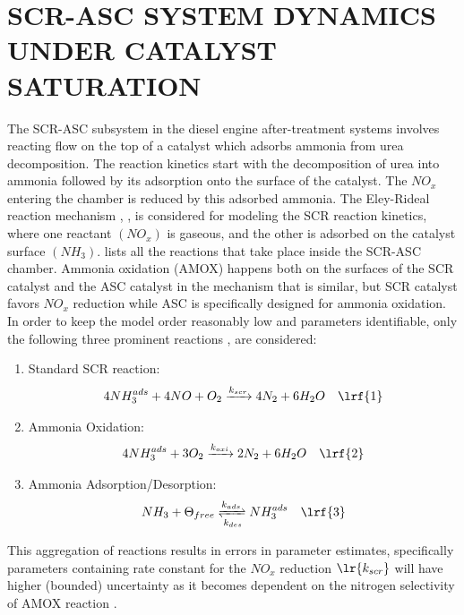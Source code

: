 \section{SCR-ASC SYSTEM DYNAMICS UNDER CATALYST SATURATION}
The SCR-ASC subsystem in the diesel engine after-treatment systems involves reacting flow on the top of a catalyst which
adsorbs ammonia from urea decomposition. The reaction kinetics start with the decomposition of urea into ammonia
followed by its adsorption onto the surface of the catalyst. The $NO_x$ entering the chamber is reduced by this adsorbed
ammonia. The Eley-Rideal reaction mechanism \cite{yuan2015diesel}, \cite{hsieh2011development}, \cite{nova2014urea} is
considered for modeling the SCR reaction kinetics, where one reactant $(NO_x)$ is gaseous, and the other is adsorbed on
the catalyst surface $(NH_3)$. \cite{nova2014urea} lists all the reactions that take place inside the
SCR-ASC chamber. Ammonia oxidation (AMOX) happens both on the surfaces of the SCR catalyst and the ASC catalyst in the
mechanism that is similar, but SCR catalyst favors $NO_x$ reduction while ASC is specifically designed for ammonia
oxidation.
In order to keep the model order reasonably low and parameters identifiable, only the following three prominent reactions \cite{devarakonda2008adequacy},\cite{hsieh2011development} are considered:
\begin{enumerate}
    \item Standard SCR reaction:
    \begin{align*}
        4 NH_3 ^{ads} + 4 NO + O_2 &\xrightarrow[]{k_{scr}} 4 N_2 + 6 H_2O %
        & \lrf{1}
    \end{align*}
    \item Ammonia Oxidation:
    \begin{align*}
        4 NH_3^{ads} + 3 O_2 &\xrightarrow[]{k_{oxi}} 2 N_2 + 6 H_2O %
        & \lrf{2}
    \end{align*}
    \item Ammonia Adsorption/Desorption:
        \begin{align*}
            NH_3 + \Theta_{free} &\xrightleftharpoons[k_{des}]{k_{ads}} NH_3^{ads}
            & \lrf{3}
        \end{align*}
\end{enumerate}

This aggregation of reactions results in errors in parameter estimates, specifically parameters containing rate constant
for the $NO_x$ reduction $\lr{k_{scr}}$ will have higher (bounded) uncertainty as it becomes dependent on the nitrogen
selectivity of AMOX reaction \cite{jain2023diagnostics}.

